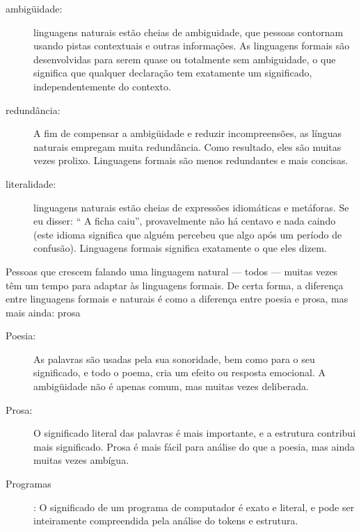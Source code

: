 \documentclass[10pt]{book}
\begin{document}
\begin{description}

\item[ambigüidade:] linguagens naturais estão cheias de ambiguidade, que
pessoas contornam usando pistas contextuais e outras informações.
As linguagens formais são desenvolvidas para serem quase ou totalmente sem ambiguidade,
o que significa que qualquer declaração tem exatamente um significado,
independentemente do contexto.

\item[redundância:] A fim de compensar a ambigüidade e reduzir
incompreensões, as línguas naturais empregam muita
redundância. Como resultado, eles são muitas vezes prolixo. Linguagens formais
são menos redundantes e mais concisas.

\item[literalidade:] linguagens naturais estão cheias de expressões idiomáticas e metáforas.
Se eu disser: `` A ficha caiu'', provavelmente não há centavo e
nada caindo (este idioma significa que alguém percebeu que algo
após um período de confusão). Linguagens formais
significa exatamente o que eles dizem.

\end{description}

Pessoas que crescem falando uma linguagem natural --- todos --- muitas vezes têm um
tempo para adaptar às linguagens formais. De certa forma, a diferença
entre linguagens formais e naturais é como a diferença entre
poesia e prosa, mas mais ainda:
\index{} prosa

\begin{description}

\item[Poesia:] As palavras são usadas pela sua sonoridade, bem como para
o seu significado, e todo o poema, cria um efeito ou
resposta emocional. A ambigüidade não é apenas comum, mas muitas vezes
deliberada.

\item[Prosa:] O significado literal das palavras é mais importante,
e a estrutura contribui mais significado. Prosa é mais fácil para
análise do que a poesia, mas ainda muitas vezes ambígua.

\item[Programas]: O significado de um programa de computador é exato
e literal, e pode ser inteiramente compreendida pela análise do
tokens e estrutura.

\end{description}
\end{document}
